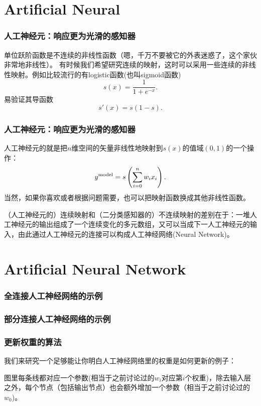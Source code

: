 \documentclass[CJK]{beamer}
\begin{document}
  \section{Artificial Neural}
  \begin{frame}
    \frametitle{人工神经元：响应更为光滑的感知器}
    单位跃阶函数是不连续的非线性函数（嗯，千万不要被它的外表迷惑了，这个家伙非常地非线性）。 有时候我们希望研究连续的映射，这时可以采用一些连续的非线性映射。例如比较流行的有logistic函数(也叫sigmoid函数)
    $$s(x) = \frac{1}{1+e^{-x}}.$$
    易验证其导函数
    $$ s'(x) = s(1-s).$$
    \emini
    \emini
  \end{frame}


  \begin{frame}
    \frametitle{人工神经元：响应更为光滑的感知器}
    人工神经元的就是把$n$维空间的矢量非线性地映射到$s(x)$的值域$(0,1)$的一个操作：
    $$ y^{\rm model} = s\left(\sum_{i=0}^n w_ix_i\right). $$
    当然，如果你喜欢或者根据问题需要，也可以把映射函数换成其他非线性函数。

    （人工神经元的）连续映射和（二分类感知器的）不连续映射的差别在于：一堆人工神经元的输出组成了一个连续变化的多元数组，又可以当成下一人工神经元的输入，由此通过人工神经元的连接可以构成人工神经网络(Neural Network)。
  \end{frame}

  \section{Artificial Neural Network}


  \begin{frame}
    \frametitle{全连接人工神经网络的示例}
  \end{frame}


  \begin{frame}
    \frametitle{部分连接人工神经网络的示例}
  \end{frame}


  \begin{frame}
    \frametitle{更新权重的算法}
    我们来研究一个足够能让你明白人工神经网络里的权重是如何更新的例子：


    图里每条线都对应一个参数(相当于之前讨论过的$w_i$对应第$i$个权重)，除去输入层之外，每个节点（包括输出节点）也会额外增加一个参数（相当于之前讨论过的$w_0$)。
  \end{frame}
\end{document}
